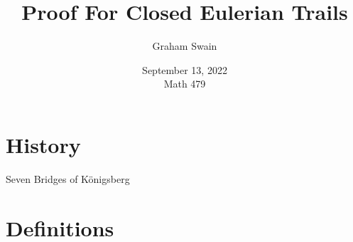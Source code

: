 \documentclass{beamer}
\title{Proof For Closed Eulerian Trails}
\author[Graham Swain]{Graham Swain}
\date{September 13, 2022 \\ Math 479}
\begin{document}
    
\frame{\titlepage}

\section{History}

\begin{frame}{Seven Bridges of K\"{o}nigsberg}
	\begin{figure}
		\centering
	\end{figure}
\end{frame}

\section{Definitions}
\end{document}
